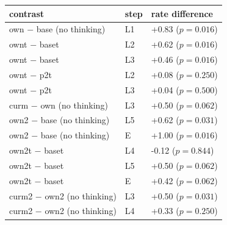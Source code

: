 \begin{tabular}{lll}
\toprule
contrast & step & rate difference \\
\midrule
own $-$ base (no thinking) & L1 & +0.83 ($p=0.016$) \\
ownt $-$ baset & L2 & +0.62 ($p=0.016$) \\
ownt $-$ baset & L3 & +0.46 ($p=0.016$) \\
ownt $-$ p2t & L2 & +0.08 ($p=0.250$) \\
ownt $-$ p2t & L3 & +0.04 ($p=0.500$) \\
curm $-$ own (no thinking) & L3 & +0.50 ($p=0.062$) \\
\midrule
own2 $-$ base (no thinking) & L5 & +0.62 ($p=0.031$) \\
own2 $-$ base (no thinking) & E & +1.00 ($p=0.016$) \\
own2t $-$ baset & L4 & -0.12 ($p=0.844$) \\
own2t $-$ baset & L5 & +0.50 ($p=0.062$) \\
own2t $-$ baset & E & +0.42 ($p=0.062$) \\
curm2 $-$ own2 (no thinking) & L3 & +0.50 ($p=0.031$) \\
curm2 $-$ own2 (no thinking) & L4 & +0.33 ($p=0.250$) \\
\bottomrule
\end{tabular}
